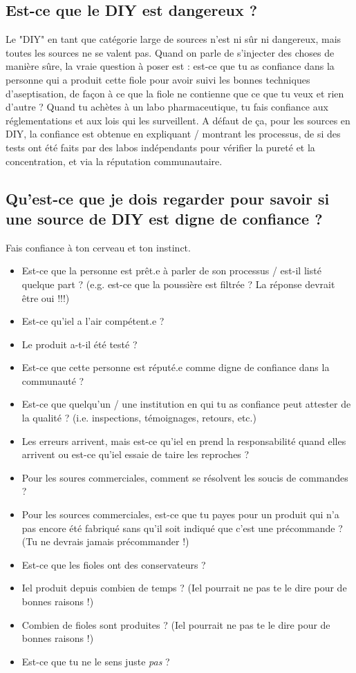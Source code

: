 \documentclass{article}
\begin{document}
\subsection{Est-ce que le DIY est dangereux ?}

Le "DIY" en tant que catégorie large de sources n'est ni sûr ni dangereux, mais toutes les sources ne se valent pas. Quand on parle de s'injecter des choses de manière sûre, la vraie question à poser est : est-ce que tu as confiance dans la personne qui a produit cette fiole pour avoir suivi les bonnes techniques d'aseptisation, de façon à ce que la fiole ne contienne que ce que tu veux et rien d'autre ? Quand tu achètes à un labo pharmaceutique, tu fais confiance aux réglementations et aux lois qui les surveillent. A défaut de ça, pour les sources en DIY, la confiance est obtenue en expliquant / montrant les processus, de si des tests ont été faits par des labos indépendants pour vérifier la pureté et la concentration, et via la réputation communautaire.  

\subsection{Qu'est-ce que je dois regarder pour savoir si une source de DIY est digne de confiance ?}

Fais confiance à ton cerveau et ton instinct.

\begin{itemize}
  \item Est-ce que la personne est prêt.e à parler de son processus / est-il listé quelque part ? (e.g. est-ce que la poussière est filtrée ? La réponse devrait être oui !!!)
  \item Est-ce qu'iel a l'air compétent.e ?
  \item Le produit a-t-il été testé ? 
  \item Est-ce que cette personne est réputé.e comme digne de confiance dans la communauté ?
  \item Est-ce que quelqu'un / une institution en qui tu as confiance peut attester de la qualité ? (i.e. inspections, témoignages, retours, etc.)
  \item Les erreurs arrivent, mais est-ce qu'iel en prend la responsabilité quand elles arrivent ou est-ce qu'iel essaie de taire les reproches ? 
  \item Pour les soures commerciales, comment se résolvent les soucis de commandes ?
  \item Pour les sources commerciales, est-ce que tu payes pour un produit qui n'a pas encore été fabriqué sans qu'il soit indiqué que c'est une précommande ? (Tu ne devrais jamais précommander !)
  \item Est-ce que les fioles ont des conservateurs ?
  \item Iel produit depuis combien de temps ? (Iel pourrait ne pas te le dire pour de bonnes raisons !)
  \item Combien de fioles sont produites ? (Iel pourrait ne pas te le dire pour de bonnes raisons !)
  \item Est-ce que tu ne le sens juste \textit{pas} ?
\end{itemize}
\end{document}
